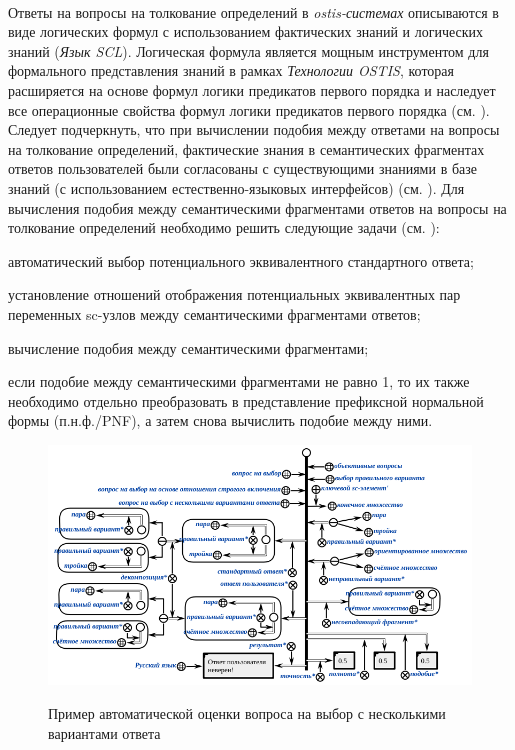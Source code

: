 ~\\
Ответы на вопросы на толкование определений в \textit{ostis-системах} описываются в виде логических формул с использованием фактических знаний и логических знаний (\textit{Язык SCL}). Логическая формула является мощным инструментом для формального представления знаний в рамках \textit{Технологии OSTIS}, которая расширяется на основе формул логики предикатов первого порядка и наследует все операционные свойства формул логики предикатов первого порядка (см. ). Следует подчеркнуть, что при вычислении подобия между ответами на вопросы на толкование определений, фактические знания в семантических фрагментах ответов пользователей были согласованы с существующими знаниями в базе знаний (с использованием естественно-языковых интерфейсов) (см. ). Для вычисления подобия между семантическими фрагментами ответов на вопросы на толкование определений необходимо решить следующие задачи (см. ):

\begin{textitemize}
	\item автоматический выбор потенциального эквивалентного стандартного ответа;
	\item установление отношений отображения потенциальных эквивалентных пар переменных sc-узлов между семантическими фрагментами ответов;
	\item вычисление подобия между семантическими фрагментами;
	\item если подобие между семантическими фрагментами не равно 1, то их также необходимо отдельно преобразовать в представление префиксной нормальной формы (п.н.ф./PNF), а затем снова вычислить подобие между ними.
\end{textitemize}

\begin{figure}[H]
	\caption{Пример автоматической оценки вопроса на выбор с несколькими вариантами ответа}
	\includegraphics[scale=0.7]{author/part7/figures/answer_verification_example.png}
	\label{fig:AV_example}
\end{figure}

